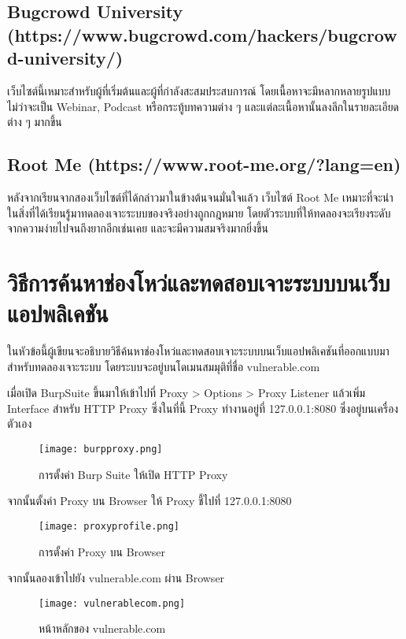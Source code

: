 \subsection{Bugcrowd University (https://www.bugcrowd.com/hackers/bugcrowd-university/)}

เว็บไซต์นี้เหมาะสำหรับผู้ที่เริ่มต้นและผู้ที่กำลังสะสมประสบการณ์ โดยเนื้อหาจะมีหลากหลายรูปแบบ ไม่ว่าจะเป็น Webinar, Podcast หรือกระทู้บทความต่าง ๆ และแต่ละเนื้อหานั้นลงลึกในรายละเอียดต่าง ๆ มากขึ้น

\subsection{Root Me (https://www.root-me.org/?lang=en)}

หลังจากเรียนจากสองเว็บไซต์ที่ได้กล่าวมาในข้างต้นจนมั่นใจแล้ว เว็บไซต์ Root Me เหมาะที่จะนำในสิ่งที่ได้เรียนรู้มาทดลองเจาะระบบของจริงอย่างถูกกฎหมาย โดยตัวระบบที่ให้ทดลองจะเรียงระดับจากความง่ายไปจนถึงยากอีกเช่นเคย และจะมีความสมจริงมากยิ่งขึ้น

\section{วิธีการค้นหาช่องโหว่และทดสอบเจาะระบบบนเว็บแอปพลิเคชัน}
ในหัวข้อนี้ผู้เขียนจะอธิบายวิธีค้นหาช่องโหว่และทดสอบเจาะระบบบนเว็บแอปพลิเคชันที่ออกแบบมาสำหรับทดลองเจาะระบบ \cite{??} โดยระบบจะอยู่บนโดเมนสมมุติที่ชื่อ vulnerable.com

เมื่อเปิด BurpSuite ขึ้นมาให้เข้าไปที่ Proxy > Options > Proxy Listener แล้วเพิ่ม Interface สำหรับ HTTP Proxy ซึ่งในที่นี้ Proxy ทำงานอยู่ที่ 127.0.0.1:8080 ซึ่งอยู่บนเครื่องตัวเอง

\begin{figure}[h]
	\centering
	\texttt{[image: burpproxy.png]}
	\caption{การตั้งค่า Burp Suite ให้เปิด HTTP Proxy}
	\label{Fig:burpproxy.png}
\end{figure}

จากนั้นตั้งค่า Proxy บน Browser ให้ Proxy ชี้ไปที่ 127.0.0.1:8080

\begin{figure}[h]
	\centering
	\texttt{[image: proxyprofile.png]}
	\caption{การตั้งค่า Proxy บน Browser}
	\label{Fig:proxyprofile.png}
\end{figure}

จากนั้นลองเข้าไปยัง vulnerable.com ผ่าน Browser

\begin{figure}[h]
	\centering
	\texttt{[image: vulnerablecom.png]}
	\caption{หน้าหลักของ vulnerable.com}
	\label{Fig:vulnerablecom.png}
\end{figure}

